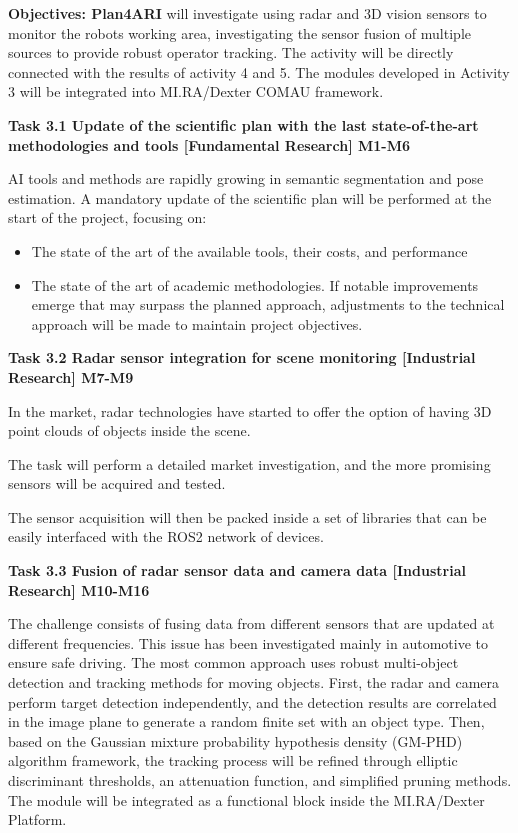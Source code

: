 \begin{planactivitybody}
\textbf{Objectives: Plan4ARI} will investigate using radar and 3D vision
sensors to monitor the robot\textquotesingle s working area,
investigating the sensor fusion of multiple sources to provide robust
operator tracking. The activity will be directly connected with the
results of activity 4 and 5. The modules developed in Activity 3 will be
integrated into MI.RA/Dexter COMAU framework.

\plantaskskip
\textbf{Task 3.1 Update of the scientific plan with the last
state-of-the-art methodologies and tools {[}Fundamental Research{]}
M1-M6}

AI tools and methods are rapidly growing in semantic segmentation and
pose estimation. A mandatory update of the scientific plan will be
performed at the start of the project, focusing on:

\begin{itemize}
\item
  The state of the art of the available tools, their costs, and
  performance
\item
  The state of the art of academic methodologies. If notable
  improvements emerge that may surpass the planned approach, adjustments
  to the technical approach will be made to maintain project objectives.
\end{itemize}

\plantaskskip
\textbf{Task 3.2 Radar sensor integration for scene monitoring
{[}Industrial Research{]} M7-M9}

In the market, radar technologies have started to offer the option of
having 3D point clouds of objects inside the scene.

The task will perform a detailed market investigation, and the more
promising sensors will be acquired and tested.

The sensor acquisition will then be packed inside a set of libraries
that can be easily interfaced with the ROS2 network of devices.

\plantaskskip
\textbf{Task 3.3 Fusion of radar sensor data and camera data
{[}Industrial Research{]} M10-M16}

The challenge consists of fusing data from different sensors that are
updated at different frequencies. This issue has been investigated
mainly in automotive to ensure safe driving. The most common approach
uses robust multi-object detection and tracking methods for moving
objects. First, the radar and camera perform target detection
independently, and the detection results are correlated in the image
plane to generate a random finite set with an object type. Then, based
on the Gaussian mixture probability hypothesis density (GM-PHD)
algorithm framework, the tracking process will be refined through
elliptic discriminant thresholds, an attenuation function, and
simplified pruning methods. The module will be integrated as a
functional block inside the MI.RA/Dexter Platform.


\end{planactivitybody}
